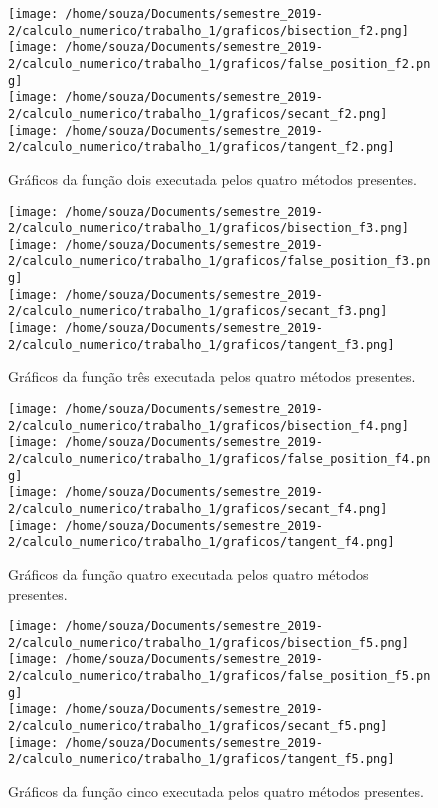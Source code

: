 \documentclass[12pt]{article}
\begin{document}
\begin{figure}[!h]
    \centering
    \texttt{[image: /home/souza/Documents/semestre\_2019-2/calculo\_numerico/trabalho\_1/graficos/bisection\_f2.png]}
    \texttt{[image: /home/souza/Documents/semestre\_2019-2/calculo\_numerico/trabalho\_1/graficos/false\_position\_f2.png]}\\
    \texttt{[image: /home/souza/Documents/semestre\_2019-2/calculo\_numerico/trabalho\_1/graficos/secant\_f2.png]}
    \texttt{[image: /home/souza/Documents/semestre\_2019-2/calculo\_numerico/trabalho\_1/graficos/tangent\_f2.png]}
    \caption{Gráficos da função dois executada pelos quatro métodos presentes.}
\end{figure}

\begin{figure}[!h]
    \centering
    \texttt{[image: /home/souza/Documents/semestre\_2019-2/calculo\_numerico/trabalho\_1/graficos/bisection\_f3.png]}
    \texttt{[image: /home/souza/Documents/semestre\_2019-2/calculo\_numerico/trabalho\_1/graficos/false\_position\_f3.png]}\\
    \texttt{[image: /home/souza/Documents/semestre\_2019-2/calculo\_numerico/trabalho\_1/graficos/secant\_f3.png]}
    \texttt{[image: /home/souza/Documents/semestre\_2019-2/calculo\_numerico/trabalho\_1/graficos/tangent\_f3.png]}
    \caption{Gráficos da função três executada pelos quatro métodos presentes.}
\end{figure}

\begin{figure}[!h]
    \centering
    \texttt{[image: /home/souza/Documents/semestre\_2019-2/calculo\_numerico/trabalho\_1/graficos/bisection\_f4.png]}
    \texttt{[image: /home/souza/Documents/semestre\_2019-2/calculo\_numerico/trabalho\_1/graficos/false\_position\_f4.png]}\\
    \texttt{[image: /home/souza/Documents/semestre\_2019-2/calculo\_numerico/trabalho\_1/graficos/secant\_f4.png]}
    \texttt{[image: /home/souza/Documents/semestre\_2019-2/calculo\_numerico/trabalho\_1/graficos/tangent\_f4.png]}
    \caption{Gráficos da função quatro executada pelos quatro métodos presentes.}
\end{figure}

\begin{figure}[!h]
    \centering
    \texttt{[image: /home/souza/Documents/semestre\_2019-2/calculo\_numerico/trabalho\_1/graficos/bisection\_f5.png]}
    \texttt{[image: /home/souza/Documents/semestre\_2019-2/calculo\_numerico/trabalho\_1/graficos/false\_position\_f5.png]}\\
    \texttt{[image: /home/souza/Documents/semestre\_2019-2/calculo\_numerico/trabalho\_1/graficos/secant\_f5.png]}
    \texttt{[image: /home/souza/Documents/semestre\_2019-2/calculo\_numerico/trabalho\_1/graficos/tangent\_f5.png]}
    \caption{Gráficos da função cinco executada pelos quatro métodos presentes.}
\end{figure}
\end{document}
